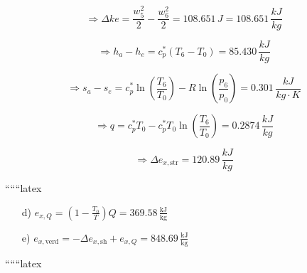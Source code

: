 \[
\Rightarrow \Delta ke = \frac{w_5^2}{2} - \frac{w_6^2}{2} = 108.651 \, J = 108.651 \, \frac{kJ}{kg}
\]

\[
\Rightarrow h_a - h_e = c_p^* (T_6 - T_0) = 85.430 \, \frac{kJ}{kg}
\]

\[
\Rightarrow s_a - s_e = c_p^* \ln \left( \frac{T_6}{T_0} \right) - R \ln \left( \frac{p_6}{p_0} \right) = 0.301 \, \frac{kJ}{kg \cdot K}
\]

\[
\Rightarrow q = c_p^* T_0 - c_p^* T_0 \ln \left( \frac{T_6}{T_0} \right) = 0.2874 \, \frac{kJ}{kg}
\]

\[
\Rightarrow \Delta e_{x, \text{str}} = 120.89 \, \frac{kJ}{kg}
\]

``````latex


\begin{itemize}
    \item[d)] \( e_{x,Q} = \left( 1 - \frac{T_0}{T} \right) Q = 369.58 \, \frac{\text{kJ}}{\text{kg}} \)
    \item[e)] \( e_{x,\text{verd}} = - \Delta e_{x,\text{sh}} + e_{x,Q} = 848.69 \, \frac{\text{kJ}}{\text{kg}} \)
\end{itemize}

``````latex


